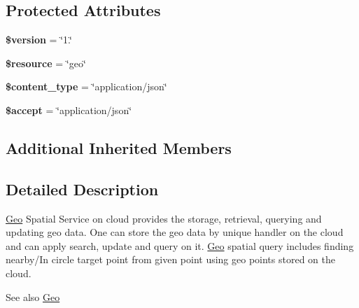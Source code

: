 \subsection*{Protected Attributes}
\begin{DoxyCompactItemize}
\item 
\hypertarget{class_geo_service_a17c8948c68aa44fa9961ae169b6a8961}{{\bfseries \$version} = \char`\"{}1.\char`\"{}}\label{class_geo_service_a17c8948c68aa44fa9961ae169b6a8961}

\item 
\hypertarget{class_geo_service_abd4c7b8b084214b8d2533ba07fce6b83}{{\bfseries \$resource} = \char`\"{}geo\char`\"{}}\label{class_geo_service_abd4c7b8b084214b8d2533ba07fce6b83}

\item 
\hypertarget{class_geo_service_ae754d6373f275e781f47c8bc9b994b6d}{{\bfseries \$content\+\_\+type} = \char`\"{}application/json\char`\"{}}\label{class_geo_service_ae754d6373f275e781f47c8bc9b994b6d}

\item 
\hypertarget{class_geo_service_a75fc18c4ff06288ff9fdf8aba9bd1081}{{\bfseries \$accept} = \char`\"{}application/json\char`\"{}}\label{class_geo_service_a75fc18c4ff06288ff9fdf8aba9bd1081}

\end{DoxyCompactItemize}
\subsection*{Additional Inherited Members}


\subsection{Detailed Description}
\hyperlink{class_geo}{Geo} Spatial Service on cloud provides the storage, retrieval, querying and updating geo data. One can store the geo data by unique handler on the cloud and can apply search, update and query on it. \hyperlink{class_geo}{Geo} spatial query includes finding nearby/\+In circle target point from given point using geo points stored on the cloud.

\begin{DoxySeeAlso}{See also}
\hyperlink{class_geo}{Geo} 
\end{DoxySeeAlso}


